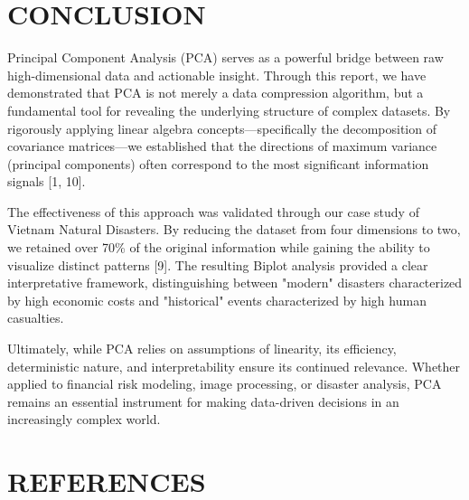 \documentclass[12pt, a4paper]{report}
\begin{document}
\chapter{\MakeUppercase{Conclusion}}

Principal Component Analysis (PCA) serves as a powerful bridge between raw high-dimensional data and actionable insight. Through this report, we have demonstrated that PCA is not merely a data compression algorithm, but a fundamental tool for revealing the underlying structure of complex datasets. By rigorously applying linear algebra concepts—specifically the decomposition of covariance matrices—we established that the directions of maximum variance (principal components) often correspond to the most significant information signals [1, 10].

The effectiveness of this approach was validated through our case study of Vietnam Natural Disasters. By reducing the dataset from four dimensions to two, we retained over 70\% of the original information while gaining the ability to visualize distinct patterns [9]. The resulting Biplot analysis provided a clear interpretative framework, distinguishing between "modern" disasters characterized by high economic costs and "historical" events characterized by high human casualties.

Ultimately, while PCA relies on assumptions of linearity, its efficiency, deterministic nature, and interpretability ensure its continued relevance. Whether applied to financial risk modeling, image processing, or disaster analysis, PCA remains an essential instrument for making data-driven decisions in an increasingly complex world.

\newpage
\chapter{\MakeUppercase{References}}
\end{document}
